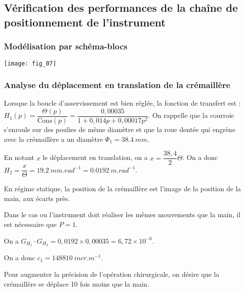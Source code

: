 \subsection*{Vérification des performances de la chaîne de positionnement de l'instrument}
\subsubsection*{Modélisation par schéma-blocs}
\ifprof
\else
\begin{table*}[!h]
\centering
\texttt{[image: fig\_07]}
\end{table*}
\fi

\subsubsection*{Analyse du déplacement en translation de la crémaillère}
\ifprof
\else
Lorsque la boucle d’asservissement est bien réglée, la fonction de transfert est : $H_1(p)=\dfrac{\Theta(p)}{\text{Cons}(p)} = \dfrac{0,00035}{1+0,014p+0,00017 p^2}$. 
On rappelle que la courroie s’enroule sur des poulies de même diamètre et que la roue dentée qui engrène avec la crémaillère a un diamètre $\Phi_1 = \SI{38,4}{mm}$.
\fi

\ifprof
\begin{corrige}
En notant $x$ le déplacement en translation, on a $x=\dfrac{38,4}{2} \Theta$. On a donc $H_2 =\dfrac{x}{\Theta}=\SI{19,2}{mm.rad^{-1}}=\SI{0,0192}{m.rad^{-1}}$.   
\end{corrige}
\else
\fi

En régime statique, la position de la crémaillère est l’image de la position de la main, aux écarts près. 

\ifprof
\begin{corrige}
Dans le cas ou l'instrument doit réaliser les mêmes mouvements que la main, il est nécessaire que $P=1$. 

On  a $G_{H_1}\cdot G_{H_2} = 0,0192 \times 0,00035 = 6,72\times 10^{-6}$.
 
On a donc $c_1 = \SI{148 810}{incr.m^{-1}}$.
\end{corrige}
\else
\fi

Pour augmenter la précision de l’opération chirurgicale, on désire que la crémaillère se déplace 10 fois moins que la main. 




